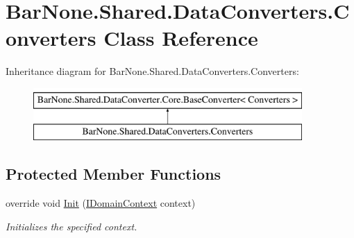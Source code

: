 \hypertarget{class_bar_none_1_1_shared_1_1_data_converters_1_1_converters}{}\section{Bar\+None.\+Shared.\+Data\+Converters.\+Converters Class Reference}
\label{class_bar_none_1_1_shared_1_1_data_converters_1_1_converters}
Inheritance diagram for Bar\+None.\+Shared.\+Data\+Converters.\+Converters\+:\begin{figure}[H]
\begin{center}
\leavevmode
\includegraphics[height=2.000000cm]{class_bar_none_1_1_shared_1_1_data_converters_1_1_converters}
\end{center}
\end{figure}
\subsection*{Protected Member Functions}
\begin{DoxyCompactItemize}
\item 
override void \mbox{\hyperlink{class_bar_none_1_1_shared_1_1_data_converters_1_1_converters_a2583a5056da92c661cb16776f99c0e5d}{Init}} (\mbox{\hyperlink{interface_bar_none_1_1_shared_1_1_core_1_1_i_domain_context}{I\+Domain\+Context}} context)
\begin{DoxyCompactList}\small\item\em Initializes the specified context. \end{DoxyCompactList}\end{DoxyCompactItemize}
